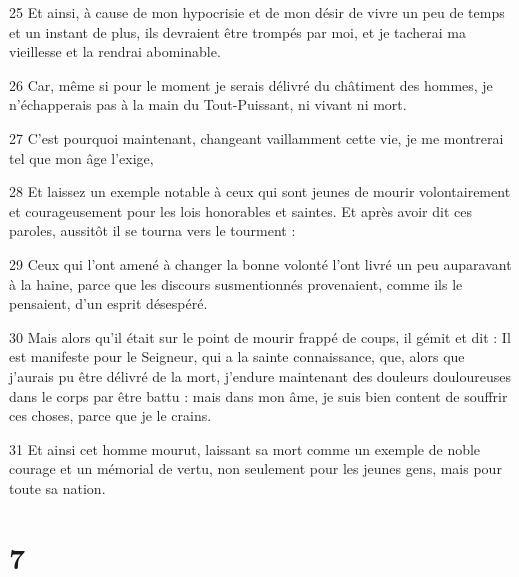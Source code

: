 \par 25 Et ainsi, à cause de mon hypocrisie et de mon désir de vivre un peu de temps et un instant de plus, ils devraient être trompés par moi, et je tacherai ma vieillesse et la rendrai abominable.
\par 26 Car, même si pour le moment je serais délivré du châtiment des hommes, je n'échapperais pas à la main du Tout-Puissant, ni vivant ni mort.
\par 27 C'est pourquoi maintenant, changeant vaillamment cette vie, je me montrerai tel que mon âge l'exige,
\par 28 Et laissez un exemple notable à ceux qui sont jeunes de mourir volontairement et courageusement pour les lois honorables et saintes. Et après avoir dit ces paroles, aussitôt il se tourna vers le tourment :
\par 29 Ceux qui l'ont amené à changer la bonne volonté l'ont livré un peu auparavant à la haine, parce que les discours susmentionnés provenaient, comme ils le pensaient, d'un esprit désespéré.
\par 30 Mais alors qu'il était sur le point de mourir frappé de coups, il gémit et dit : Il est manifeste pour le Seigneur, qui a la sainte connaissance, que, alors que j'aurais pu être délivré de la mort, j'endure maintenant des douleurs douloureuses dans le corps par être battu : mais dans mon âme, je suis bien content de souffrir ces choses, parce que je le crains.
\par 31 Et ainsi cet homme mourut, laissant sa mort comme un exemple de noble courage et un mémorial de vertu, non seulement pour les jeunes gens, mais pour toute sa nation.

\chapter{7}

